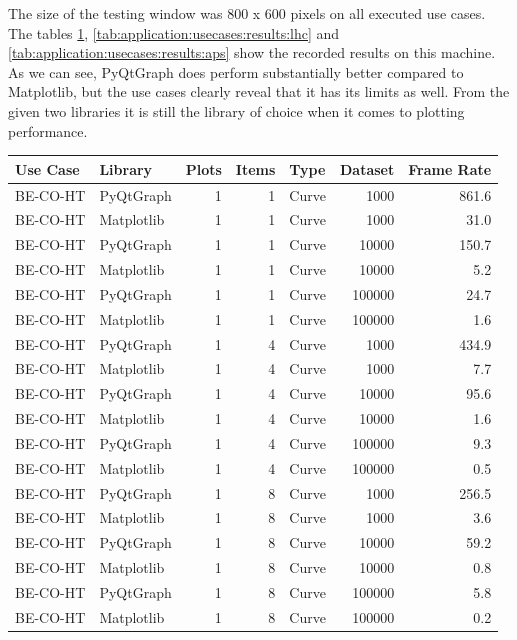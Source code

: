 The size of the testing window was 800 x 600 pixels on all executed use cases.
The tables \ref{tab:application:usecases:results:ht},
\ref{tab:application:usecases:results:lhc} and
\ref{tab:application:usecases:results:aps} show the recorded results on
this machine. As we can see, PyQtGraph does perform substantially better compared
to Matplotlib, but the use cases clearly reveal that it has its limits as well.
From the given two libraries it is still the library of choice when it comes to
plotting performance.


\begin{table}[h]
\begin{center}

\label{tab:application:usecases:results:ht}

\begin{tabular}{llrrlrr}

\hline
Use Case  & Library    & Plots & Items & Type    & Dataset & Frame Rate  \\
\hline
BE-CO-HT  & PyQtGraph  & 1     & 1     & Curve   & 1000    & 861.6       \\
BE-CO-HT  & Matplotlib & 1     & 1     & Curve   & 1000    & 31.0        \\
BE-CO-HT  & PyQtGraph  & 1     & 1     & Curve   & 10000   & 150.7       \\
BE-CO-HT  & Matplotlib & 1     & 1     & Curve   & 10000   & 5.2         \\
BE-CO-HT  & PyQtGraph  & 1     & 1     & Curve   & 100000  & 24.7        \\
BE-CO-HT  & Matplotlib & 1     & 1     & Curve   & 100000  & 1.6         \\
\hline
BE-CO-HT  & PyQtGraph  & 1     & 4     & Curve   & 1000    & 434.9       \\
BE-CO-HT  & Matplotlib & 1     & 4     & Curve   & 1000    & 7.7         \\
BE-CO-HT  & PyQtGraph  & 1     & 4     & Curve   & 10000   & 95.6        \\
BE-CO-HT  & Matplotlib & 1     & 4     & Curve   & 10000   & 1.6         \\
BE-CO-HT  & PyQtGraph  & 1     & 4     & Curve   & 100000  & 9.3         \\
BE-CO-HT  & Matplotlib & 1     & 4     & Curve   & 100000  & 0.5         \\
\hline
BE-CO-HT  & PyQtGraph  & 1     & 8     & Curve   & 1000    & 256.5       \\
BE-CO-HT  & Matplotlib & 1     & 8     & Curve   & 1000    & 3.6         \\
BE-CO-HT  & PyQtGraph  & 1     & 8     & Curve   & 10000   & 59.2        \\
BE-CO-HT  & Matplotlib & 1     & 8     & Curve   & 10000   & 0.8         \\
BE-CO-HT  & PyQtGraph  & 1     & 8     & Curve   & 100000  & 5.8         \\
BE-CO-HT  & Matplotlib & 1     & 8     & Curve   & 100000  & 0.2         \\
\hline


\end{tabular}
\end{center}
\end{table}
